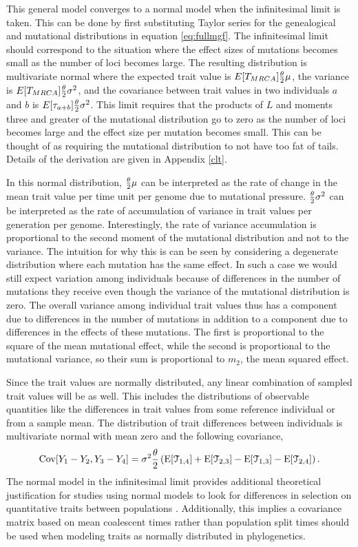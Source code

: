 This general model converges to a normal model when the infinitesimal limit is
taken. This can be done by first substituting Taylor series for the genealogical
and mutational distributions in equation \eqref{eq:fullmgf}. The infinitesimal
limit should correspond to the situation where the effect sizes of mutations
becomes small as the number of loci becomes large. The resulting distribution is
multivariate normal where the expected trait value is $E[T_{MRCA}] \frac{\theta}{2} \mu$, the
variance is $E[T_{MRCA}] \frac{\theta}{2} \sigma^2$, and the covariance between trait values in
two individuals $a$ and $b$ is $E[\tau_{a+b}] \frac{\theta}{2} \sigma^2$. This limit requires
that the products of $L$ and moments three and greater of the mutational
distribution go to zero as the number of loci becomes large and the effect size
per mutation becomes small. This can be thought of as requiring the mutational
distribution to not have too fat of tails. Details of the derivation are given
in Appendix \ref{clt}.

In this normal distribution, $\frac{\theta}{2} \mu$ can be interpreted as the rate of change
in the mean trait value per time unit per genome due to mutational pressure.
$\frac{\theta}{2} \sigma^2$ can be interpreted as the rate of accumulation of variance in
trait values per generation per genome. Interestingly, the rate of variance
accumulation is proportional to the second moment of the mutational distribution
and not to the variance. The intuition for why this is can be seen by
considering a degenerate distribution where each mutation has the same effect.
In such a case we would still expect variation among individuals because of
differences in the number of mutations they receive even though the variance of
the mutational distribution is zero. The overall variance among individual trait
values thus has a component due to differences in the number of mutations in
addition to a component due to differences in the effects of these mutations.
The first is proportional to the square of the mean mutational effect, while the
second is proportional to the mutational variance, so their sum is proportional
to $m_2$, the mean squared effect.

Since the trait values are normally distributed, any linear combination of
sampled trait values will be as well. This includes the distributions of
observable quantities like the differences in trait values from some reference
individual or from a sample mean. The distribution of trait differences between
individuals is multivariate normal with mean zero and the following covariance,
\begin{equation}
\mathrm{Cov}[Y_1-Y_2,Y_3-Y_4] = \sigma^2\frac{\theta}{2}\left( \mathrm{E}[\mathcal{T}_{1,4}] + \mathrm{E}[\mathcal{T}_{2,3}] -
\mathrm{E}[\mathcal{T}_{1,3}] - \mathrm{E}[\mathcal{T}_{2,4}] \right).
\end{equation}
The normal model in the infinitesimal limit provides additional theoretical
justification for studies using normal models to look for differences in
selection on quantitative traits between populations
\citep{Ovaskainen2011,Praebel2013,Robinson2015}. Additionally, this implies 
a covariance matrix based on mean coalescent times rather than population split
times should be used when modeling traits as normally distributed in
phylogenetics.

